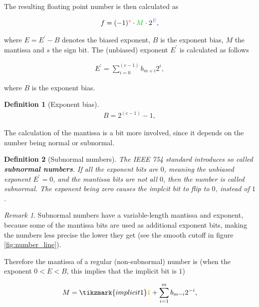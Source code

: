 \documentclass{article}
\theoremstyle{plain} %
\newtheorem{definition}{Definition}[section]
\theoremstyle{remark} %
\newtheorem*{remark}{Remark} %
\def\df#1{\textbf{\textit{#1}}}
\numberwithin{equation}{section}
\begin{document}
The resulting floating point number is then calculated as

\begin{align*}
    f = (-1)^{\textcolor{corange}{s}} \cdot \textcolor{cgreen}{M} \cdot 2^{\textcolor{cblue}{E}},
\end{align*}

where $E=E^{\prime}-B$ denotes the biased exponent, $B$ is the exponent bias, $M$ the mantissa and $s$ the sign bit. The (unbiased) exponent $E^{\prime}$ is calculated as follows

\begin{align}
    E^{\prime} = \sum_{i=0}^{(e-1)} b_{m+i} 2^i, \label{eq:exponent}
\end{align}

where $B$ is the exponent bias.

\begin{definition}[Exponent bias]

\begin{align*}
    B = 2^{(e-1)} -1,
\end{align*}

\end{definition}

The calculation of the mantissa is a bit more involved, since it depends on the number being normal or subnormal.

\begin{definition}[Subnormal numbers]

The IEEE 754 standard introduces so called \df{subnormal numbers}. If all the exponent bits are $0$, meaning the unbiased exponent $E^{\prime}=0$, and the mantissa bits are not all $0$, then the number is called subnormal. The exponent being zero causes the implcit bit to flip to $0$, instead of $1$.

\end{definition}

\begin{remark}
    Subnormal numbers have a variable-length mantissa and exponent, because some of the mantissa bits are used as additional exponent bits, making the numbers less precise the lower they get (see the smooth cutoff in figure \ref{fig:number_line}).
\end{remark}

Therefore the mantissa of a regular (non-subnormal) number is (when the exponent $0<E<B$, this implies that the implicit bit is $1$)

\begin{align*}
    M = \tikzmark{implicit1}\textcolor{cyellow}{1} + \sum_{i=1}^{m} b_{m-i} 2^{-i},
\end{align*}
\end{document}
